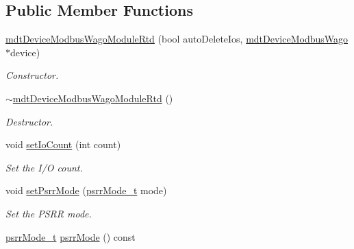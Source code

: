 \subsection*{Public Member Functions}
\begin{DoxyCompactItemize}
\item 
\hyperlink{classmdt_device_modbus_wago_module_rtd_a4d48b7646a6a1da76126f8b32aa6f499}{mdtDeviceModbusWagoModuleRtd} (bool autoDeleteIos, \hyperlink{classmdt_device_modbus_wago}{mdtDeviceModbusWago} $\ast$device)
\begin{DoxyCompactList}\small\item\em Constructor. \end{DoxyCompactList}\item 
\hyperlink{classmdt_device_modbus_wago_module_rtd_adb24199c383fdefc7ec5359996a838cd}{$\sim$mdtDeviceModbusWagoModuleRtd} ()
\begin{DoxyCompactList}\small\item\em Destructor. \end{DoxyCompactList}\item 
void \hyperlink{classmdt_device_modbus_wago_module_rtd_a2865bb4247e46306ee2279e39a3b5a48}{setIoCount} (int count)
\begin{DoxyCompactList}\small\item\em Set the I/O count. \end{DoxyCompactList}\item 
\hypertarget{classmdt_device_modbus_wago_module_rtd_a03caaa6473f4237f105596f9b2d35c03}{
void \hyperlink{classmdt_device_modbus_wago_module_rtd_a03caaa6473f4237f105596f9b2d35c03}{setPsrrMode} (\hyperlink{classmdt_device_modbus_wago_module_rtd_ae235a58228b7c648e7ab89af05ea5037}{psrrMode\_\-t} mode)}
\label{classmdt_device_modbus_wago_module_rtd_a03caaa6473f4237f105596f9b2d35c03}

\begin{DoxyCompactList}\small\item\em Set the PSRR mode. \end{DoxyCompactList}\item 
\hypertarget{classmdt_device_modbus_wago_module_rtd_a6caf3ac10935128b182e558249107302}{
\hyperlink{classmdt_device_modbus_wago_module_rtd_ae235a58228b7c648e7ab89af05ea5037}{psrrMode\_\-t} \hyperlink{classmdt_device_modbus_wago_module_rtd_a6caf3ac10935128b182e558249107302}{psrrMode} () const }
\label{classmdt_device_modbus_wago_module_rtd_a6caf3ac10935128b182e558249107302}


\end{DoxyCompactItemize}

